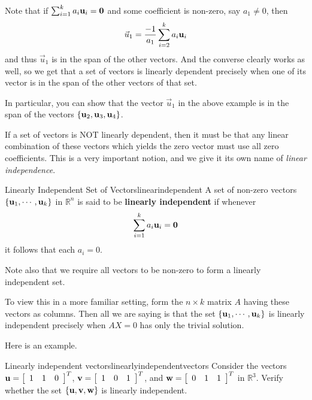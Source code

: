 Note that if $\sum_{i=1}^{k}a_{i}{\bf u}_{i}={\bf 0}$ and some
coefficient is non-zero, say $a_1 \neq 0$, then 
\begin{equation*}
\vec{u}_1 = \frac{-1}{a_1} \sum_{i=2}^{k}a_{i}{\bf u}_{i} 
\end{equation*}
and thus $\vec{u}_1$ is in the span of the other vectors. And the converse clearly works as well,
so we get that a set of vectors is linearly dependent precisely when
one of its vector is in the span of the other vectors of that set.

In particular, you can show that the vector $\vec{u}_1$ in the above
example is in the span of the vectors  $\{ {\bf u}_2, {\bf u}_3, {\bf u}_4 \}$. 

If a set of vectors is NOT linearly dependent, then it must be that
any linear combination of these vectors which yields the zero vector
must use all zero coefficients. This is a very important notion, and we give it its own name of {\em
linear independence}. 

\begin{definition}{Linearly Independent Set of Vectors}{linearindependent}
A set of non-zero vectors $\{ {\bf u}_1, \cdots ,{\bf u}_k\}$ in $\mathbb{R}^{n}$ is said to be 
\textbf{linearly independent} if whenever 
\begin{equation*}
\sum_{i=1}^{k}a_{i}{\bf u}_{i}={\bf 0}
\end{equation*}
it follows that each $a_{i}=0$.
\end{definition}


Note also that we require all vectors to be non-zero to form a
linearly independent set.

To view this in a more familiar setting, form the $n \times k$ matrix
$A$ having these vectors as columns. Then all we are saying is that
the set $\{ {\bf u}_1, \cdots ,{\bf u}_k\}$ is linearly independent
precisely when $AX=0$ has only the trivial solution.

Here is an example.  

\begin{example}{Linearly independent vectors}{linearlyindependentvectors}
Consider the vectors ${\bf u}=\left[ 
\begin{array}{rrr}
1  & 1 & 0
\end{array}
\right]^T$, 
${\bf v}=\left[ 
\begin{array}{rrr}
1  & 0 & 1
\end{array}
\right]^T$, and
${\bf w}=\left[ 
\begin{array}{rrr}
0  & 1 & 1
\end{array}
\right]^T$ in $\mathbb{R}^{3}$.
Verify whether the set $\{{\bf u}, {\bf v}, {\bf w}\}$ is linearly independent. 
\end{example}

